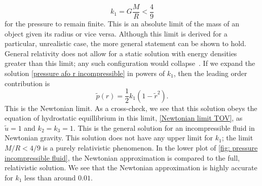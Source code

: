 %
\begin{equation}
    \label{mass-radius constraint}
    k_1 = G \frac{M}{R} < \frac{4}{9}
\end{equation}
%
for the pressure to remain finite.
This is an absolute limit of the mass of an object given its radius or vice versa.
Although this limit is derived for a particular, unrealistic case, the more general statement can be shown to hold.
General relativity does not allow for a static solution with energy densities greater than this limit; any such configuration would collapse~\autocite{carrollSpacetimeGeometryIntroduction2019}.
If we expand the solution \autoref{pressure afo r incompressible} in powers of $k_1$, then the leading order contribution is
%
\begin{equation}
    \tilde p(r) = \frac{1}{2} k_1 (1 - \tilde r^2).
\end{equation}
%
This is the Newtonian limit.
As a cross-check, we see that this solution obeys the equation of hydrostatic equillibrium in this limit, \autoref{Newtonian limit TOV}, as $\tilde u = 1$ and $k_2 = k_3 = 1$.
This is the general solution for an incompressible fluid in Newtonian gravity.
This solution does not have any upper limit for $k_1$; the limit $M/R < 4 / 9$ is a purely relativistic phenomenon.
In the lower plot of \autoref{fig: pressure incompressible fluid}, the Newtonian approximation is compared to the full, relativistic solution.
We see that the Newtonian approximation is highly accurate for $k_1$ less than around $0.01$.


